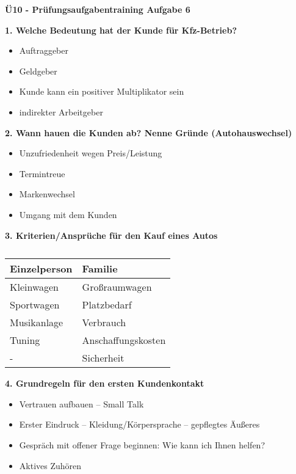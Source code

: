 \textbf{Ü10 - Prüfungsaufgabentraining Aufgabe 6}

\textbf{1. Welche Bedeutung hat der Kunde für Kfz-Betrieb?}

\begin{itemize}
\item
  Auftraggeber
\item
  Geldgeber
\item
  Kunde kann ein positiver Multiplikator sein
\item
  indirekter Arbeitgeber
\end{itemize}

\textbf{2. Wann hauen die Kunden ab? Nenne Gründe (Autohauswechsel)}

\begin{itemize}
\item
  Unzufriedenheit wegen Preis/Leistung
\item
  Termintreue
\item
  Markenwechsel
\item
  Umgang mit dem Kunden
\end{itemize}

\textbf{3. Kriterien/Ansprüche für den Kauf eines Autos}

\begin{table}[!ht]%
\centering 
	\caption{}%
\begin{tabular}{@{}ll@{}}
\hline
\textbf{Einzelperson} & \textbf{Familie} \\
\hline
Kleinwagen & Großraumwagen \\
Sportwagen & Platzbedarf \\
Musikanlage & Verbrauch \\
Tuning & Anschaffungskosten \\
- & Sicherheit \\
\hline
\end{tabular} 
\end{table}

\textbf{4. Grundregeln für den ersten Kundenkontakt}

\begin{itemize}
\item
  Vertrauen aufbauen -- Small Talk
\item
  Erster Eindruck -- Kleidung/Körpersprache -- gepflegtes Äußeres
\item
  Gespräch mit offener Frage beginnen: Wie kann ich Ihnen helfen?
\item
  Aktives Zuhören
\end{itemize}

